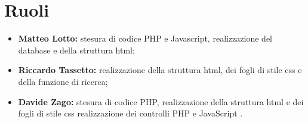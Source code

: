 \section{Ruoli}
\begin{itemize}
	\item \textbf{Matteo Lotto:} stesura di codice PHP e Javascript, realizzazione del database e della struttura html;
	\item \textbf{Riccardo Tassetto:} realizzazione della struttura html, dei fogli di stile css e della funzione di ricerca;
	\item \textbf{Davide Zago:} stesura di codice PHP, realizzazione della struttura html e dei fogli di stile css realizzazione dei controlli PHP e JavaScript .
\end{itemize}